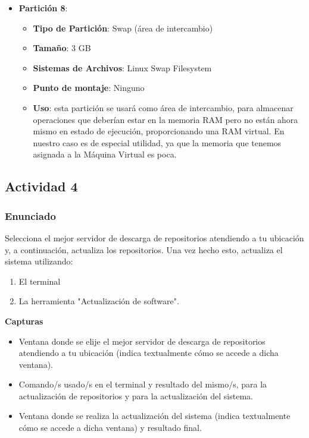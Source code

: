 \begin{itemize}
    \item \textbf{Partición 8}:
    \begin{itemize}
        \item \textbf{Tipo de Partición}: Swap (área de intercambio)
        \item \textbf{Tamaño}: 3 GB
        \item \textbf{Sistemas de Archivos}: Linux Swap Filesystem
        \item \textbf{Punto de montaje}: Ninguno
        \item \textbf{Uso}: esta partición se usará como área de intercambio, para almacenar operaciones que deberían estar en la memoria RAM pero no están ahora mismo en estado de ejecución, proporcionando una RAM virtual. En nuestro caso es de especial utilidad, ya que la memoria que tenemos asignada a la Máquina Virtual es poca.
    \end{itemize}
\end{itemize}

\subsection{Actividad 4}

\subsubsection{Enunciado}
Selecciona el mejor servidor de descarga de repositorios atendiendo a tu ubicación y, a continuación, actualiza los repositorios. Una vez hecho esto, actualiza el sistema utilizando:

\begin{enumerate}
    \item El terminal
    \item La herramienta "Actualización de software".
\end{enumerate}

\textbf{Capturas}
\begin{itemize}
    \item Ventana donde se elije el mejor servidor de descarga de repositorios atendiendo a tu ubicación (indica textualmente cómo se accede a dicha ventana).
    \item Comando/s usado/s en el terminal y resultado del mismo/s, para la actualización de repositorios y para la actualización del sistema.
    \item Ventana donde se realiza la actualización del sistema (indica textualmente cómo se accede a dicha ventana) y resultado final.
\end{itemize}

